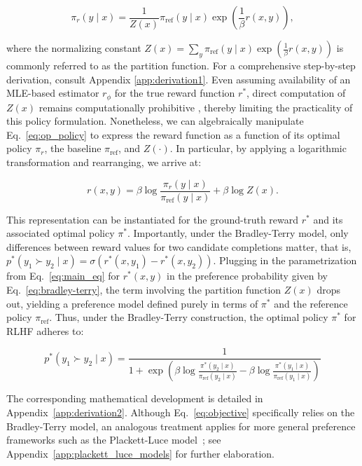 \begin{equation}\label{eq:op_policy}
    \pi_r(y\mid x) = \frac{1}{Z(x)}\pi_\text{ref}(y\mid x)\exp\left(\frac{1}{\beta}r(x, y)\right),
\end{equation}

where the normalizing constant $Z(x) = \sum_{y}\pi_\text{ref}(y\mid x)\exp\left(\frac{1}{\beta}r(x, y)\right)$ is commonly referred to as the partition function. For a comprehensive step-by-step derivation, consult Appendix \ref{app:derivation1}. Even assuming availability of an MLE-based estimator $r_{\phi}$ for the true reward function $r^*$, direct computation of $Z(x)$ remains computationally prohibitive \citep{korbak2022reinforcement, go2023aligning}, thereby limiting the practicality of this policy formulation. Nonetheless, we can algebraically manipulate Eq.~\ref{eq:op_policy} to express the reward function as a function of its optimal policy $\pi_r$, the baseline $\pi_\text{ref}$, and $Z(\cdot)$. In particular, by applying a logarithmic transformation and rearranging, we arrive at:

\begin{equation}\label{eq:main_eq}
    r(x,y) =\beta \log \frac{\pi_r(y\mid x)}{\pi_\text{ref}(y\mid x)} + \beta \log Z(x).
\end{equation}

This representation can be instantiated for the ground-truth reward $r^*$ and its associated optimal policy $\pi^*$. Importantly, under the Bradley-Terry model, only differences between reward values for two candidate completions matter, that is, ${p^*(y_1 \succ y_2 \mid x) = \sigma(r^*(x, y_1) - r^*(x, y_2))}$. Plugging in the parametrization from Eq.~\ref{eq:main_eq} for $r^*(x,y)$ in the preference probability given by Eq.~\ref{eq:bradley-terry}, the term involving the partition function $Z(x)$ drops out, yielding a preference model defined purely in terms of $\pi^*$ and the reference policy $\pi_\text{ref}$. Thus, under the Bradley-Terry construction, the optimal policy $\pi^*$ for RLHF adheres to:

\begin{equation}\label{eq:objective}
    p^*(y_1\succ y_2 \mid x)=\frac{1}{1 + \exp\left(\beta \log \frac{\pi^*(y_2\mid x)}{\pi_\text{ref}(y_2\mid x)} - \beta \log \frac{\pi^*(y_1\mid x)}{\pi_\text{ref}(y_1\mid x)}\right)}
\end{equation}

The corresponding mathematical development is detailed in Appendix~\ref{app:derivation2}. Although Eq.~\ref{eq:objective} specifically relies on the Bradley-Terry model, an analogous treatment applies for more general preference frameworks such as the Plackett-Luce model~\citep{plackett1975analysis, luce2012individual}; see Appendix~\ref{app:plackett_luce_models} for further elaboration.

